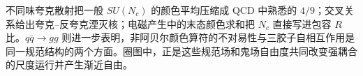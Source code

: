 不同味夸克散射把一般 $SU(N_c)$ 的颜色平均压缩成 QCD 中熟悉的 $4/9$；交叉关系给出夸克--反夸克湮灭核；电磁产生中的末态颜色求和把 $N_c$ 直接写进包容 $R$ 比。$q\bar q\to gg$ 则进一步表明，非阿贝尔颜色算符的不对易性与三胶子自相互作用是同一规范结构的两个方面。圈图中，正是这些规范场和鬼场自由度共同改变强耦合的尺度运行并产生渐近自由。






